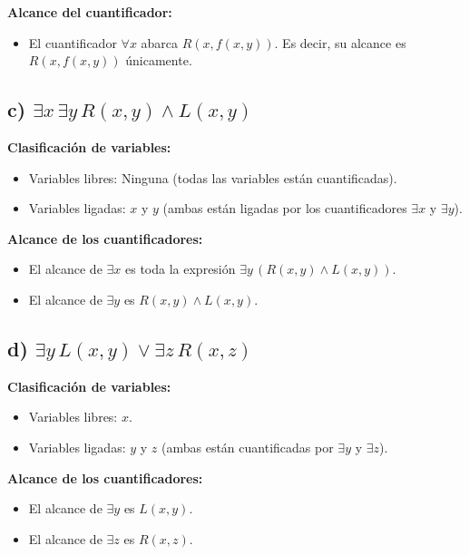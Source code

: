 \documentclass[11pt,letterpaper]{article}
\begin{document}
\textbf{Alcance del cuantificador:}
\begin{itemize}
    \item El cuantificador \( \forall x \) abarca \( R(x, f(x, y)) \). Es decir, su alcance es \( R(x, f(x, y)) \) únicamente.
\end{itemize}

\subsection*{c) \( \exists x \, \exists y \, R(x, y) \land L(x, y) \)}

\textbf{Clasificación de variables:}
\begin{itemize}
    \item Variables libres: Ninguna (todas las variables están cuantificadas).
    \item Variables ligadas: \( x \) y \( y \) (ambas están ligadas por los cuantificadores \( \exists x \) y \( \exists y \)).
\end{itemize}

\textbf{Alcance de los cuantificadores:}
\begin{itemize}
    \item El alcance de \( \exists x \) es toda la expresión \( \exists y \, (R(x, y) \land L(x, y)) \).
    \item El alcance de \( \exists y \) es \( R(x, y) \land L(x, y) \).
\end{itemize}

\subsection*{d) \( \exists y \, L(x, y) \lor \exists z \, R(x, z) \)}

\textbf{Clasificación de variables:}
\begin{itemize}
    \item Variables libres: \( x \).
    \item Variables ligadas: \( y \) y \( z \) (ambas están cuantificadas por \( \exists y \) y \( \exists z \)).
\end{itemize}

\textbf{Alcance de los cuantificadores:}
\begin{itemize}
    \item El alcance de \( \exists y \) es \( L(x, y) \).
    \item El alcance de \( \exists z \) es \( R(x, z) \).
\end{itemize}
\end{document}
